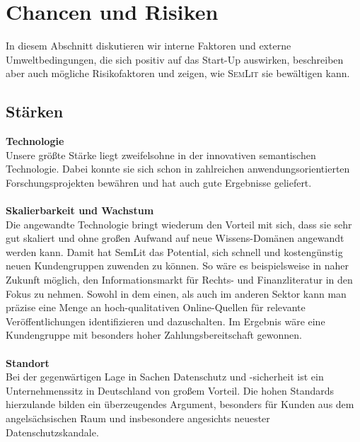 \section{Chancen und Risiken}
In diesem Abschnitt diskutieren wir interne Faktoren und externe Umweltbedingungen, die sich positiv auf das Start-Up auswirken, beschreiben aber auch mögliche Risikofaktoren und zeigen, wie \textsc{SemLit} sie bewältigen kann.
\subsection{Stärken}
\textbf{Technologie}\\
Unsere größte Stärke liegt zweifelsohne in der innovativen semantischen Technologie. Dabei konnte sie sich schon in zahlreichen anwendungsorientierten Forschungsprojekten bewähren und hat auch gute Ergebnisse geliefert.
\\
\\
\textbf{Skalierbarkeit und Wachstum}\\
Die angewandte Technologie bringt wiederum den Vorteil mit sich, dass sie sehr gut skaliert und ohne großen Aufwand auf neue Wissens-Domänen angewandt werden kann. Damit hat SemLit das Potential, sich schnell und kostengünstig neuen Kundengruppen zuwenden zu können. So wäre es beispielsweise in naher Zukunft möglich, den Informationsmarkt für Rechts- und Finanzliteratur in den Fokus zu nehmen. Sowohl in dem einen, als auch im anderen Sektor kann man präzise eine Menge an hoch-qualitativen Online-Quellen für relevante Veröffentlichungen identifizieren und dazuschalten. Im Ergebnis wäre eine Kundengruppe mit besonders hoher Zahlungsbereitschaft gewonnen.
\\
\\
\textbf{Standort}\\
Bei der gegenwärtigen Lage in Sachen Datenschutz und -sicherheit ist ein Unternehmenssitz in Deutschland von großem Vorteil. Die hohen Standards hierzulande bilden ein überzeugendes Argument, besonders für Kunden aus dem angelsächsischen Raum und insbesondere angesichts neuester Datenschutzskandale.

